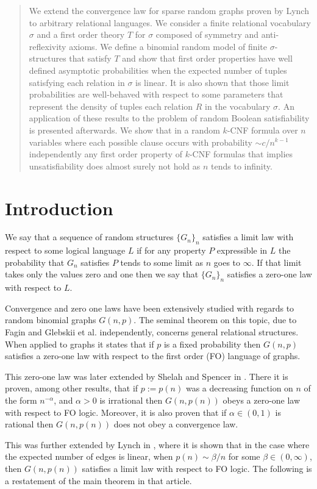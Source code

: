 \documentclass[12pt,notitlepage,a4paper]{article}
\theoremstyle{definition}
\begin{document}
\begin{abstract}
	We extend the convergence law for sparse random graphs proven
	by Lynch to arbitrary relational languages.
	We consider a finite relational vocabulary $\sigma$
	and a first order theory $T$ for $\sigma$ 
    composed of symmetry and 
    anti-reflexivity axioms. We define a binomial random model of finite 
    $\sigma$-structures that satisfy $T$ and show that first order properties have 
    well defined asymptotic probabilities when the expected number of tuples satisfying
    each relation in $\sigma$ is linear.
    It is also shown that those limit probabilities are well-behaved with
    respect to some parameters that represent the density of tuples each relation $R$ 
    in the vocabulary $\sigma$. 
    An application of these results to the problem of random Boolean 
    satisfiability is presented afterwards. 
    We show that in a random $k$-CNF formula over $n$ variables where
    each possible clause occurs with probability $\sim c/n^{k-1}$ independently any 
    first order property of $k$-CNF formulas that
    implies unsatisfiability does almost surely not hold as $n$ tends to infinity.
   
\end{abstract}
\clearpage

\section*{Introduction}

We say that a sequence of random structures $\{G_n\}_n$ satisfies a limit
law with respect to some logical language $L$ if for any property $P$ expressible in
$L$ the probability that $G_n$ satisfies $P$ tends to some limit as $n$ goes to $\infty$.
If that limit takes only the values zero and one then we say that $\{G_n\}_n$ satisfies
a zero-one law with respect to $L$.  \par
Convergence and zero one laws have been extensively studied with regards to 
random binomial graphs $G(n,p)$.
The seminal theorem on this topic, due to Fagin \cite{fagin1976probabilities}
and Glebskii et al. \cite{glebskii1969range} independently, 
concerns general relational structures.
When applied to graphs it states that if $p$ is a fixed probability
then $G(n,p)$ satisfies a zero-one law with respect to the first order
(FO) language of graphs. \par
This zero-one law was later extended by Shelah and Spencer
in \cite{shelah1988zero}. There it is proven, among other results,
that if $p:=p(n)$ was a decreasing function on
$n$ of the form $n^{-\alpha}$, and $\alpha>0$ is irrational
then $G(n,p(n))$ obeys a zero-one law with respect to FO logic. Moreover, 
it is also proven that if $\alpha\in (0,1)$ is rational then $G(n,p(n))$ 
does not obey a convergence law. \par
This was further extended by Lynch
in \cite{lynch1992probabilities}, where it is shown that in the
case where the expected number of edges is linear, when $p(n)\sim \beta/n$
for some $\beta\in (0,\infty)$, then $G(n,p(n))$ satisfies a limit law with
respect to FO logic. The following is a restatement of the main theorem
in that article.
\end{document}

